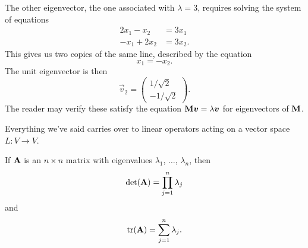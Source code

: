 \begin{example}
The other eigenvector, the one associated with $\lambda=3$, requires
solving the system of equations
\begin{subequations}
  \begin{align}
    2x_{1} -x_{2} &= 3x_{1}\\
    -x_{1} + 2x_{2} &= 3x_{2}.
  \end{align}
\end{subequations}
This gives us two copies of the same line, described by the equation
\begin{equation}
x_{1} = -x_{2}.
\end{equation}
The unit eigenvector is then
\begin{equation}
\vec{v}_{2} = \begin{pmatrix}1/\sqrt{2}\\
-1/\sqrt{2}
\end{pmatrix}.
\end{equation}
The reader may verify these satisfy the equation $\mathbf{M}\boldsymbol{v}=\lambda\boldsymbol{v}$
for eigenvectors of $\mathbf{M}$.
\end{example}


\M
Everything we've said carries over to linear operators acting on a
vector space $L\colon V\to V$.

\begin{lemma}\label{lemma:linear-transformations:det-and-tr-using-eigenvalues}
If $\mathbf{A}$ is an $n\times n$ matrix with eigenvalues $\lambda_{1}$,
$\dots$, $\lambda_{n}$, then
\begin{equation}
\det(\mathbf{A}) = \prod^{n}_{j=1}\lambda_{j}
\end{equation}
and
\begin{equation}
\mathop{\rm tr}\nolimits(\mathbf{A}) = \sum^{n}_{j=1}\lambda_{j}.
\end{equation}
\end{lemma}

